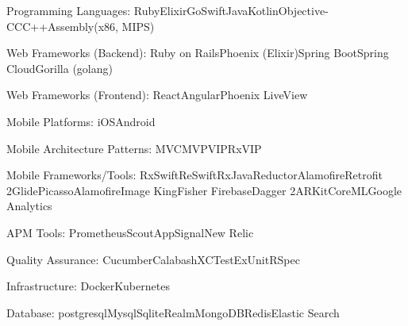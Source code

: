 \documentclass[10pt,a4paper]{article} %
\begin{document}


\inlineheadsection %
{Programming Languages:}
{Ruby\bull Elixir\bull Go\bull Swift\bull Java\bull Kotlin\bull Objective-C\bull C\bull C++\bull Assembly(x86, MIPS)}

\inlineheadsection %
{Web Frameworks (Backend):}
{Ruby on Rails\bull Phoenix (Elixir)\bull  Spring Boot\bull Spring Cloud\bull Gorilla (golang)}

\inlineheadsection %
{Web Frameworks (Frontend):}
{React\bull Angular\bull Phoenix LiveView}

\inlineheadsection %
{Mobile Platforms:}
{iOS\bull Android}

\inlineheadsection %
{Mobile Architecture Patterns:}
{MVC\bull MVP\bull VIP\bull RxVIP}

\inlineheadsection %
{Mobile Frameworks/Tools:}
{RxSwift\bull ReSwift\bull RxJava\bull Reductor\bull Alamofire\bull Retrofit 2\bull Glide\bull Picasso\bull AlamofireImage \bull KingFisher
\bull Firebase\bull Dagger 2\bull ARKit\bull CoreML\bull Google Analytics}

\inlineheadsection %
{APM Tools:}
{Prometheus\bull Scout\bull AppSignal\bull New Relic}

\inlineheadsection %
{Quality Assurance:}
{Cucumber\bull Calabash\bull XCTest\bull ExUnit\bull RSpec}

\inlineheadsection %
{Infrastructure:}
{Docker\bull Kubernetes}

\inlineheadsection %
{Database:}
{postgresql\bull Mysql\bull Sqlite\bull Realm\bull MongoDB\bull Redis\bull Elastic Search}
\end{document}
